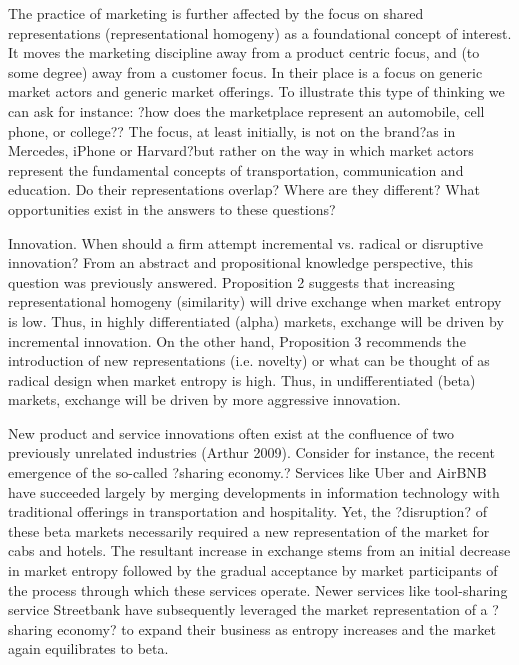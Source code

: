 The practice of marketing is further affected by the focus on shared representations (representational homogeny) as a foundational concept of interest. It moves the marketing discipline away from a product centric focus, and (to some degree) away from a customer focus. In their place is a focus on generic market actors and generic market offerings. To illustrate this type of thinking we can ask for instance: ?how does the marketplace represent an automobile, cell phone, or college?? The focus, at least initially, is not on the brand?as in Mercedes, iPhone or Harvard?but rather on the way in which market actors represent the fundamental concepts of transportation, communication and education. Do their representations overlap? Where are they different? What opportunities exist in the answers to these questions?     

Innovation. 
When should a firm attempt incremental vs. radical or disruptive innovation? From an abstract and propositional knowledge perspective, this question was previously answered. Proposition 2 suggests that increasing representational homogeny (similarity) will drive exchange when market entropy is low. Thus, in highly differentiated (alpha) markets, exchange will be driven by incremental innovation. On the other hand, Proposition 3 recommends the introduction of new representations (i.e. novelty) or what can be thought of as radical design when market entropy is high. Thus, in undifferentiated (beta) markets, exchange will be driven by more aggressive innovation. 

New product and service innovations often exist at the confluence of two previously unrelated industries (Arthur 2009). Consider for instance, the recent emergence of the so-called ?sharing economy.? Services like Uber  and AirBNB  have succeeded largely by merging developments in information technology with traditional offerings in transportation and hospitality. Yet, the ?disruption? of these beta markets necessarily required a new representation of the market for cabs and hotels. The resultant increase in exchange stems from an initial decrease in market entropy followed by the gradual acceptance by market participants of the process through which these services operate. Newer services like tool-sharing service Streetbank  have subsequently leveraged the market representation of a ?sharing economy? to expand their business as entropy increases and the market again equilibrates to beta. 

